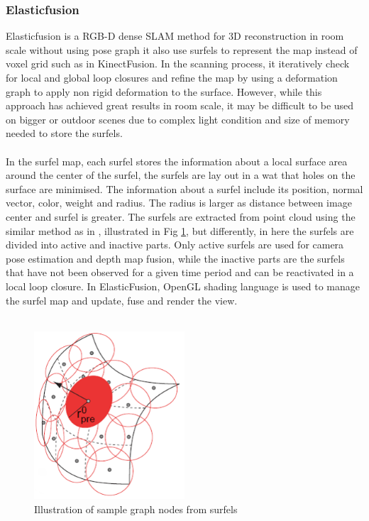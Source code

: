 \documentclass[12pt,twoside]{article}
\begin{document}
\subsubsection{Elasticfusion}
Elasticfusion\cite{whelan2016elasticfusion} is a RGB-D dense SLAM method for 3D reconstruction in room scale without using pose graph  it also use surfels to represent the map instead of voxel grid such as in KinectFusion\cite{newcombe2011kinectfusion}. In the scanning process, it iteratively check for local and global loop closures and refine the map by using a deformation graph to apply non rigid deformation to the surface. However, while this approach has achieved great results in room scale, it may be difficult to be used on bigger or outdoor scenes due to complex light condition and size of memory needed to store the surfels.\\
\\
In the surfel map, each surfel stores the information about a local surface area around the center of the surfel, the surfels are lay out in a wat that holes on the surface are minimised. The information about a surfel include its position, normal vector, color, weight and radius. The radius is larger as distance between image center and surfel is greater. The surfels are extracted from point cloud using the similar method as in \citep{keller2013real}, illustrated in Fig \ref{fig:surfel2}, but differently, in here the surfels are divided into active and inactive parts. Only active surfels are used for camera pose estimation and depth map fusion, while the inactive parts are the surfels that have not been observed for a given time period and can be reactivated in a local loop closure. In ElasticFusion, OpenGL shading language is used to manage the surfel map and update, fuse and render the view. \\
\\
\begin{figure}[h]
    \centering
    \includegraphics[width=0.5\textwidth]{figures/surfel2}
    \caption{Illustration of sample graph nodes from surfels}
    \label{fig:surfel2}
\end{figure}
\end{document}
